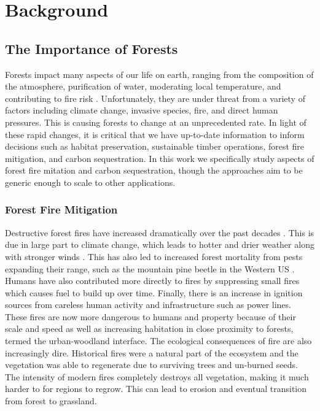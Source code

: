 
\chapter{Background} \label{chapBackground}
\section{The Importance of Forests}

Forests impact many aspects of our life on earth, ranging from the composition of the atmosphere, purification of water, moderating local temperature, and contributing to fire risk \cite{IPCC2019ClimateReport}. Unfortunately, they are under threat from a variety of factors including climate change, invasive species, fire, and direct human pressures. This is causing forests to change at an unprecedented rate. In light of these rapid changes, it is critical that we have up-to-date information to inform decisions such as habitat preservation, sustainable timber operations, forest fire mitigation, and carbon sequestration. In this work we specifically study aspects of forest fire mitation and carbon sequestration, though the approaches aim to be generic enough to scale to other applications. 

\subsection{Forest Fire Mitigation} 
Destructive forest fires have increased dramatically over the past decades \cite{spreading_like_wildfire, ayanz2021, nfn2022}. This is due in large part to climate change, which leads to hotter and drier weather along with stronger winds \cite{spreading_like_wildfire}. This has also led to increased forest mortality from pests expanding their range, such as the mountain pine beetle in the Western US \cite{Jenkins2014AndFuels}. Humans have also contributed more directly to fires by suppressing small fires which causes fuel to build up over time. Finally, there is an increase in ignition sources from careless human activity and infrastructure such as power lines. These fires are now more dangerous to humans and property because of their scale and speed as well as increasing habitation in close proximity to forests, termed the urban-woodland interface. The ecological consequences of fire are also increasingly dire. Historical fires were a natural part of the ecosystem and the vegetation was able to regenerate due to surviving trees and un-burned seeds. The intensity of modern fires completely destroys all vegetation, making it much harder to for regions to regrow. This can lead to erosion and eventual transition from forest to grassland.

